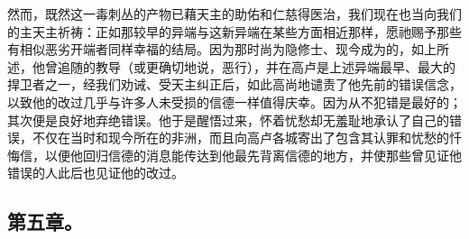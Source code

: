 然而，既然这一毒刺丛的产物已藉天主的助佑和仁慈得医治，我们现在也当向我们的主天主祈祷：正如那较早的异端与这新异端在某些方面相近那样，愿祂赐予那些有相似恶劣开端者同样幸福的结局。因为那时尚为隐修士、现今成为的，如上所述，他曾追随的教导（或更确切地说，恶行），并在高卢是上述异端最早、最大的捍卫者之一，经我们劝诫、受天主纠正后，如此高尚地谴责了他先前的错误信念，以致他的改过几乎与许多人未受损的信德一样值得庆幸。因为从不犯错是最好的；其次便是良好地弃绝错误。他于是醒悟过来，怀着忧愁却无羞耻地承认了自己的错误，不仅在当时和现今所在的非洲，而且向高卢各城寄出了包含其认罪和忧愁的忏悔信，以便他回归信德的消息能传达到他最先背离信德的地方，并使那些曾见证他错误的人此后也见证他的改过。\par


\subsection{第五章。}

\par

